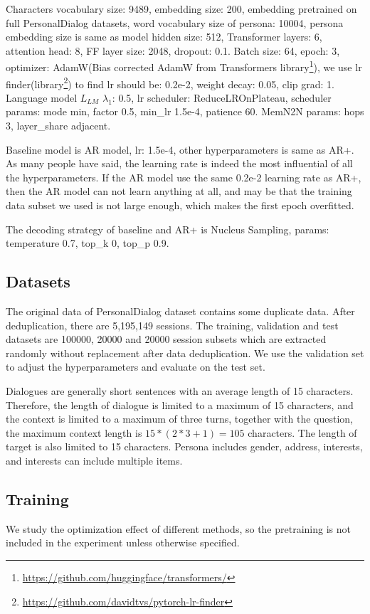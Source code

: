 \documentclass[letterpaper]{article} %
\DeclareRobustCommand{\citeext}[1]{\cite[#1]{#1}}
\begin{document}
Characters vocabulary size: 9489, embedding size: 200, embedding pretrained on full PersonalDialog datasets, word vocabulary size of persona: 10004, persona embedding size is same as model hidden size: 512, 
Transformer layers: 6, attention head: 8, FF layer size: 2048, dropout: 0.1. 
Batch size: 64, epoch: 3, optimizer: AdamW(Bias corrected AdamW from Transformers library\footnote{\url{https://github.com/huggingface/transformers/}}), we use lr finder\citeext{Smith2015}(library\footnote{\url{https://github.com/davidtvs/pytorch-lr-finder}}) to find lr should be: 0.2e-2, weight decay: 0.05, clip grad: 1.
Language model $L_{LM}$ $\lambda_1$: 0.5, lr scheduler: ReduceLROnPlateau, scheduler params: mode min, factor 0.5, min\_lr 1.5e-4, patience 60.
MemN2N params: hops 3, layer\_share adjacent.

Baseline model is AR model, lr: 1.5e-4, other hyperparameters is same as AR+. As many people have said, the learning rate is indeed the most influential of all the hyperparameters. If the AR model use the same 0.2e-2 learning rate as AR+, then the AR model can not learn anything at all, and may be that the training data subset we used is not large enough, which makes the first epoch overfitted. 

The decoding strategy of baseline and AR+ is Nucleus Sampling\citeext{Holtzman2019}, params: temperature 0.7, top\_k 0, top\_p 0.9.

\subsection[Datasets]{Datasets} 
The original data of PersonalDialog dataset contains some duplicate data. After deduplication, there are 5,195,149 sessions. The training, validation and test datasets are 100000, 20000 and 20000 session subsets which are extracted randomly without replacement after data deduplication. We use the validation set to adjust the hyperparameters and evaluate on the test set. 

Dialogues are generally short sentences with an average length of 15 characters. Therefore, the length of dialogue is limited to a maximum of 15 characters, and the context is limited to a maximum of three turns, together with the question, the maximum context length is $15*(2*3+1)=105$ characters. The length of target is also limited to 15 characters. Persona includes gender, address, interests, and interests can include multiple items. 

\subsection[Training]{Training}
We study the optimization effect of different methods, so the pretraining is not included in the experiment unless otherwise specified. 
\end{document}
